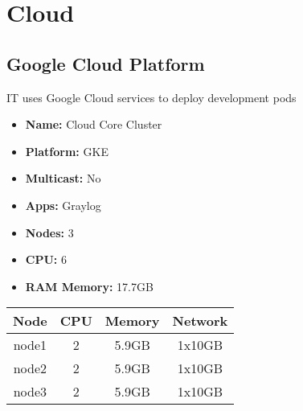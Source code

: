 \newpage
\section{Cloud}
\subsection{Google Cloud Platform}
IT uses Google Cloud services to deploy development pods
\begin{itemize}
  \itemsep0em 
  \item \textbf{Name:}       Cloud Core Cluster
  \item \textbf{Platform:}   GKE
  \item \textbf{Multicast:}  No
  \item \textbf{Apps:}       Graylog
  \item \textbf{Nodes:}      3
  \item \textbf{CPU:}        6
  \item \textbf{RAM Memory:} 17.7GB
\end{itemize}
\begin{center}
  \small
  \begin{tabular}{||c c c c||}
    \hline
    \textbf{Node} & \textbf{CPU} & \textbf{Memory} & \textbf{Network} \\ [0.5ex]
    \hline
    node1 & 2 & 5.9GB & 1x10GB \\
    \hline
    node2 & 2 & 5.9GB & 1x10GB \\
    \hline
    node3 & 2 & 5.9GB & 1x10GB \\
    \hline
  \end{tabular}
\end{center}
